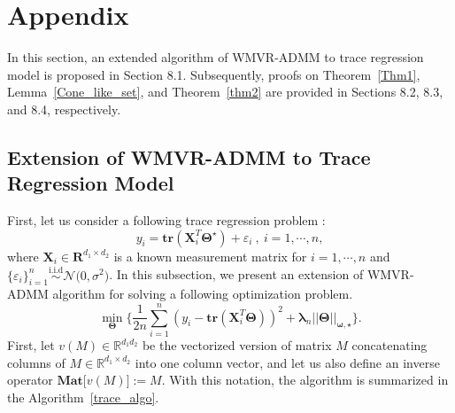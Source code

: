 \documentclass[alpha-refs]{wiley-article}
\begin{document}


\newpage
\section{Appendix}
In this section, an extended algorithm of WMVR-ADMM to trace regression model is proposed in Section 8.1.
Subsequently, proofs on Theorem~\ref{Thm1}, Lemma~\ref{Cone_like_set}, and Theorem~\ref{thm2} are provided in Sections 8.2, 8.3, and 8.4, respectively.

\subsection{Extension of WMVR-ADMM to Trace Regression Model} \label{tr_algo}
First, let us consider a following trace regression problem :
\begin{equation*}
    y_{i} = \textbf{tr}(\boldsymbol{X}^{T}_{i}\boldsymbol{\Theta^\star}) + \varepsilon_{i} \ ,\ i = 1, \cdots, n, \label{eq: TR}
\end{equation*}
where $\boldsymbol{X}_{i} \in \boldsymbol{R}^{d_{1} \times d_{2}}$ is a known measurement matrix for $i = 1, \cdots, n$ and $\big\{\varepsilon_{i}\big\}_{i=1}^{n}\stackrel{\text{i.i.d}}{\sim} \mathcal{N}\big( 0, \sigma^{2} \big)$.
In this subsection, we present an extension of WMVR-ADMM algorithm for solving a following optimization problem.
\begin{equation*}
    \min_{\boldsymbol{\Theta}} \Bigg\{ \frac{1}{2n}\sum^{n}_{i=1} (y_{i} - \textbf{tr}(\boldsymbol{X}^{T}_{i}\boldsymbol{\Theta}))^2 + \boldsymbol{\lambda}_{n} ||\boldsymbol{\Theta}||_{\boldsymbol{\omega,\star}} \Bigg\}. \label{eq: opt}
\end{equation*}
First, let $v(M)\in\mathbb{R}^{d_{1}d_{2}}$ be the vectorized version of matrix $M$ concatenating columns of $M\in\mathbb{R}^{d_{1} \times d_{2}}$ into one column vector, and let us also define an inverse operator $\textbf{Mat} \big[ v(M) \big] := M$.
With this notation, the algorithm is summarized in the Algorithm~\ref{trace_algo}.
\end{document}
